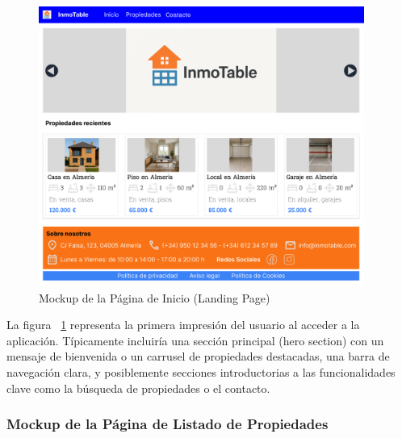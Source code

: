 \begin{figure}[H]
    \begin{center}
        \includegraphics[width = 0.95\textwidth]{Figuras/mockup_1_inicio.png}
    \end{center}
    \caption{\label{fig:mockup_1_inicio} Mockup de la Página de Inicio (Landing Page)}
\end{figure}

La figura ~\ref{fig:mockup_1_inicio} representa la primera impresión del usuario al acceder a la aplicación. Típicamente incluiría una sección principal (hero section) con un mensaje de bienvenida o un carrusel de propiedades destacadas, una barra de navegación clara, y posiblemente secciones introductorias a las funcionalidades clave como la búsqueda de propiedades o el contacto.

\subsubsection{Mockup de la Página de Listado de Propiedades}

